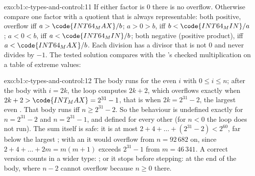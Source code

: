 \begin{solution}{exo:b1:c-types-and-control:11}
If either factor is 0 there is no overflow. Otherwise compare one factor with a quotient that is always
representable: both positive, overflow iff $a > \code{INT64_MAX} / b$; $a > 0 > b$, iff $b < \code{INT64_MIN} / a$;
$a < 0 < b$, iff $a < \code{INT64_MIN} / b$; both negative (positive product), iff $a < \code{INT64_MAX} / b$. Each
division has a divisor that is not 0 and never divides  by $-1$. The tested solution compares
with the 's checked multiplication on a table of extreme values:
\end{solution}

\begin{solution}{exo:b1:c-types-and-control:12}
The body runs for the even $i$ with $0 \leq i \leq n$; after the body with $i = 2k$, the loop computes $2k + 2$, which
overflows exactly when $2k + 2 > \code{INT_MAX} = 2^{31} - 1$, that is when $2k = 2^{31} - 2$, the largest even
. That body runs iff $n \geq 2^{31} - 2$. So the behaviour is undefined exactly for $n = 2^{31} - 2$ and
$n = 2^{31} - 1$, and defined for every other  (for $n < 0$ the loop does not run). The sum itself is
safe: it is at most $2 + 4 + \dots + (2^{31} - 2) < 2^{60}$, far below the largest ; with an
  it would overflow from $n = 92\,682$ on, since $2 + 4 + \dots + 2m = m(m + 1)$ exceeds
$2^{31} - 1$ from $m = 46\,341$. A correct version
counts in a wider type: ; or it stops before stepping:
 at the end of the body, where $n - 2$ cannot overflow because $n \geq 0$ there.
\end{solution}

